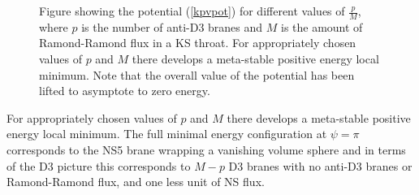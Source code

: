 \documentclass[11pt,a4paper]{article}
\numberwithin{equation}{section}
\numberwithin{table}{section}\setlength{\multlinegap}{25pt}
\begin{document}
{\begin{figure}[t]
\caption{Figure showing the potential (\ref{kpvpot}) for different values of $\frac{p}{M}$, where $p$ is the number of anti-D3 branes and $M$ is the amount of Ramond-Ramond flux in a KS throat. For appropriately chosen values of $p$ and $M$ there develops a meta-stable positive energy local minimum. Note that the overall value of the potential has been lifted to asymptote to zero energy.}
\label{fig:KPV}
\end{figure}
For appropriately chosen values of $p$ and $M$ there develops a meta-stable positive energy local minimum. The full minimal energy configuration at $\psi = \pi$ corresponds to the NS5 brane wrapping a vanishing volume sphere and in terms of the D3 picture this corresponds to $M-p$ D3 branes with no anti-D3 branes or Ramond-Ramond flux, and one less unit of NS flux.

}
\end{document}

